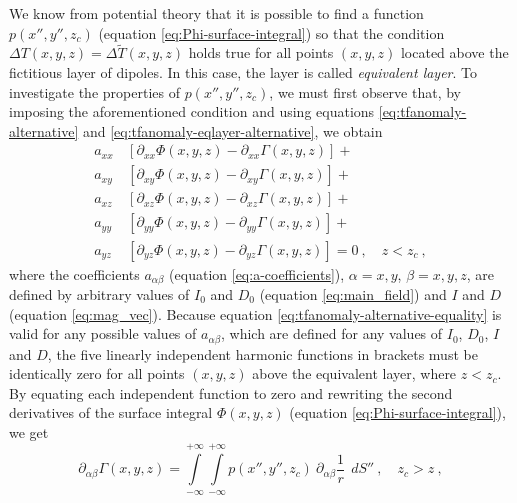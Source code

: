 We know from potential theory that it is possible to find a function $p(x'', y'', z_{c})$
(equation \ref{eq:Phi-surface-integral}) so that the condition
$\Delta T(x, y, z) = \Delta \tilde{T}(x, y, z)$ holds true for all points $(x, y, z)$
located above the fictitious layer of dipoles. 
In this case, the layer is called \textit{equivalent layer}.
To investigate the properties of $p(x'', y'', z_{c})$, we must first 
observe that, by imposing the aforementioned condition and using equations \ref{eq:tfanomaly-alternative} and \ref{eq:tfanomaly-eqlayer-alternative}, we obtain
\begin{equation}
\begin{split}
a_{xx} \, &\left[\partial_{xx} \Phi(x, y, z) - \partial_{xx} \Gamma(x, y, z) \right] + \\
a_{xy} \, &\left[\partial_{xy} \Phi(x, y, z) - \partial_{xy} \Gamma(x, y, z) \right] + \\
a_{xz} \, &\left[\partial_{xz} \Phi(x, y, z) - \partial_{xz} \Gamma(x, y, z) \right] + \\
a_{yy} \, &\left[\partial_{yy} \Phi(x, y, z) - \partial_{yy} \Gamma(x, y, z) \right] + \\
a_{yz} \, &\left[\partial_{yz} \Phi(x, y, z) - \partial_{yz} \Gamma(x, y, z) \right] = 0
\: , \quad z < z_{c} \: ,
\end{split}
\label{eq:tfanomaly-alternative-equality}
\end{equation}
where the coefficients $a_{\alpha\beta}$ (equation \ref{eq:a-coefficients}), 
$\alpha = x, y$, $\beta = x, y, z$, are defined by arbitrary values of 
$I_{0}$ and $D_{0}$ (equation \ref{eq:main_field}) and 
$I$ and $D$ (equation \ref{eq:mag_vec}).
Because equation \ref{eq:tfanomaly-alternative-equality} is valid 
for any possible values of $a_{\alpha\beta}$, which are defined for any 
values of $I_{0}$, $D_{0}$, $I$ and $D$, the five linearly independent 
harmonic functions in brackets must be identically zero for all points 
$(x, y, z)$ above the equivalent layer, where $z < z_{c}$.
By equating each independent function to zero and rewriting the 
second derivatives of the surface 
integral $\Phi(x, y, z)$ (equation \ref{eq:Phi-surface-integral}), we get
\begin{equation}
\partial_{\alpha\beta} \Gamma(x, y, z) = 
\int\limits_{-\infty}^{+\infty}\int\limits_{-\infty}^{+\infty}
p(x'', y'', z_{c}) \: \partial_{\alpha\beta} \frac{1}{r} \:\: dS'' \: ,
\quad z_{c} > z \: ,
\label{eq:D_alpha_beta_Gamma}
\end{equation}
